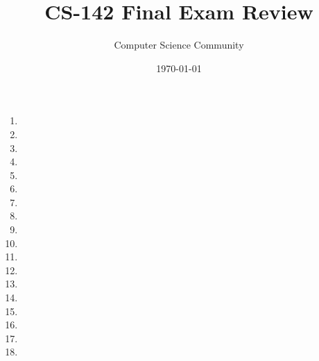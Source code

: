 \documentclass[11pt]{article}
\author{Computer Science Community}
\title{CS-142 Final Exam Review}
\date{\today}
\begin{document}
\header

\begin{enumerate}
\pagebreak
\item 

\item 

\item 

\item 

\pagebreak
\item 

\item 

\pagebreak
\item 
\vspace{1in}

\newpage
\item 

\item 

\item 

\item 

\item 


\item 

\item 

\item 

\item 

\item 

\item 


\end{enumerate}
\end{document}

